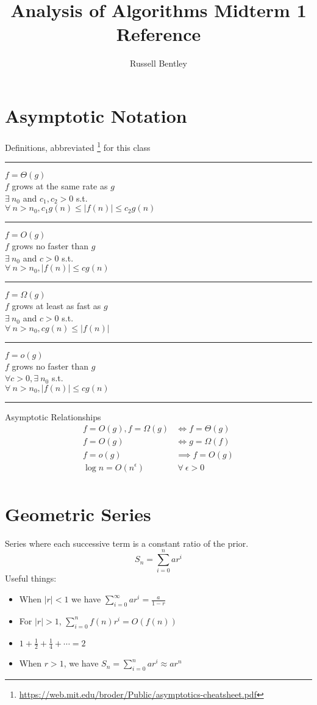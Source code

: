 \documentclass[10pt]{article}
\title{Analysis of Algorithms Midterm 1 Reference}
\author{Russell Bentley}
\begin{document}
\twocolumn

\section{Asymptotic Notation}
Definitions, abbreviated \footnote{\url{https://web.mit.edu/broder/Public/asymptotics-cheatsheet.pdf}} for this class
\hrule
$f = \Theta(g)$ \\
$f$ grows at the same rate as $g$ \\
$\exists \ n_0$ and $c_1, c_2 > 0$ s.t. \\
$\forall \ n > n_0, c_1 g(n) \leq |f(n)| \leq c_2 g(n)$
\hrule
$f = O(g)$ \\
$f$ grows no faster than $g$ \\
$\exists \ n_0$ and $c > 0$ s.t. \\
$\forall \ n > n_0, |f(n)| \leq cg(n)$
\hrule
$f = \Omega(g)$ \\ 
$f$ grows at least as fast as $g$ \\
$\exists \ n_0$ and $c > 0$ s.t. \\
$\forall \ n > n_0, c g(n) \leq |f(n)|$
\hrule
$f = o(g)$ \\ 
$f$ grows no faster than $g$ \\
$\forall c>0, \exists \ n_0$ s.t. \\
$\forall \ n > n_0, |f(n)| \leq c g(n)$
\hrule

Asymptotic Relationships
\begin{align*}
  f = O(g), f = \Omega(g) &\iff f = \Theta(g) \\
  f = O(g) &\iff g = \Omega(f) \\
  f = o(g) &\implies f = O(g) \\
  \log n = O(n^\epsilon) &\ \forall \ \epsilon > 0 \\
\end{align*}

\section{Geometric Series}
Series where each successive term is a constant ratio of the prior.
$$
S_n = \sum_{i = 0}^n ar^i
$$
Useful things:
\begin{itemize}
  \item When $|r| < 1$ we have $\sum_{i = 0}^{\infty} ar^i = \frac{a}{1 - r}$
  \item For $|r| > 1$, $\sum_{i=0}^n f(n) r^i = O(f(n))$
  \item $1 + \frac{1}{2} + \frac{1}{4} + \cdots = 2$
  \item When $r > 1$, we have $S_n = \sum_{i=0}^n ar^i \approx a r^n$
\end{itemize}
\end{document}
